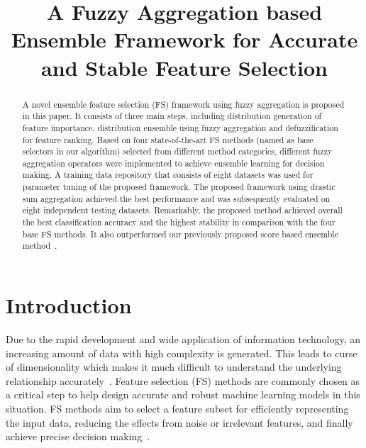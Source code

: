 \documentclass[conference]{IEEEtran}
\begin{document}
\title{A Fuzzy Aggregation based Ensemble Framework for Accurate and Stable Feature Selection\\
}

\author{
}


\maketitle


\begin{abstract}
A novel ensemble feature selection (FS) framework using fuzzy aggregation is proposed in this paper. It consists of three main steps, including distribution generation of feature importance, distribution ensemble using fuzzy aggregation and defuzzification for feature ranking. Based on four state-of-the-art FS methods (named as base selectors in our algorithm) selected from different method categories, different fuzzy aggregation operators were implemented to achieve ensemble learning for decision making. A training data repository that consists of eight datasets was used for parameter tuning of the proposed framework. The proposed framework using drastic sum aggregation achieved the best performance and was subsequently evaluated on eight independent testing datasets. Remarkably, the proposed method achieved overall the best classification accuracy and the highest stability in comparison with the four base FS methods. It also outperformed our previously proposed score based ensemble method~\cite{shen2019novel}.
\end{abstract}


\section{Introduction}
Due to the rapid development and wide application of information technology, an increasing amount of data with high complexity is generated. This leads to curse of dimensionality which makes it much difficult to understand the underlying relationship accurately~\cite{shen2018performance}. Feature selection (FS) methods are commonly chosen as a critical step to help design accurate and robust machine learning models in this situation. FS methods aim to select a feature subset for efficiently representing the input data, reducing the effects from noise or irrelevant features, and finally achieve precise decision making~\cite{guyon2003introduction}.
\end{document}
